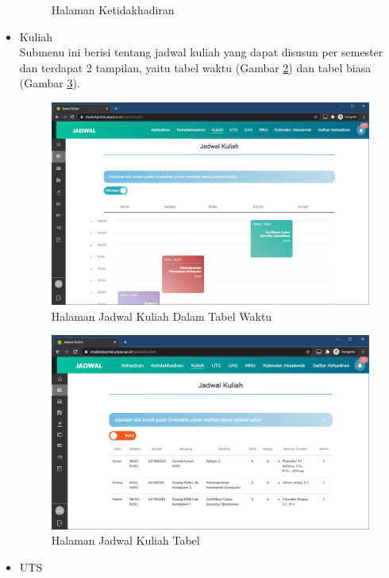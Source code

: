 \begin{itemize}
\begin{figure}[H]
    			\caption{Halaman Ketidakhadiran}
    			\label{fig:3_ketidakhadiran}
			\end{figure}
			\item Kuliah \\
			Submenu ini berisi tentang jadwal kuliah yang dapat disusun per semester dan terdapat 2 tampilan, yaitu tabel waktu (Gambar \ref{fig:3_jadwal_kuliah}) dan tabel biasa (Gambar \ref{fig:3_jadwal_kuliah_table}).
			\begin{figure}[H]
    			\centering
    			\includegraphics[scale=0.4]{Gambar/jadwal_kuliah.png}
    			\caption{Halaman Jadwal Kuliah Dalam Tabel Waktu}
    			\label{fig:3_jadwal_kuliah}
			\end{figure}
			\begin{figure}[H]
    			\centering
    			\includegraphics[scale=0.45]{Gambar/jadwal_kuliah_table.png}
    			\caption{Halaman Jadwal Kuliah Tabel}
    			\label{fig:3_jadwal_kuliah_table}
			\end{figure}
			\item UTS \\

\end{itemize}
